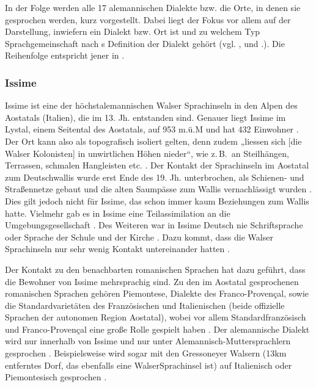 In der Folge werden alle 17 alemannischen Dialekte bzw. die Orte, in denen sie gesprochen werden, kurz vorgestellt. Dabei liegt der Fokus vor allem auf der Darstellung, inwiefern ein Dialekt bzw. Ort  ist und zu welchem Typ Sprachgemeinschaft nach  \citeauthor{Trudgill2011}s \citeyearpar{Trudgill2011} Definition der Dialekt gehört (vgl. ,  und .). Die Reihenfolge entspricht jener in .

\subsubsection{Issime}

Issime ist eine der höchstalemannischen Walser Sprachinseln in den Alpen des Aostatals (Italien), die im 13. Jh. entstanden sind. Genauer liegt Issime im Lystal, einem Seitental des Aostatals, auf 953 m.ü.M \citep[25]{Zürrer1999} und hat 432 Einwohner \citep{Issime2013}. Der Ort kann also als topografisch isoliert gelten, denn zudem „liessen sich [die Walser Kolonisten] in unwirtlichen Höhen nieder“, wie z.\,B.\ an Steilhängen, Terrassen, schmalen Hangleisten etc. \citep[31]{Zürrer1999}. Der Kontakt der Sprachinseln im Aostatal zum Deutschwallis wurde erst Ende des 19. Jh. unterbrochen, als Schienen- und Straßennetze gebaut und die alten Saumpässe zum Wallis vernachlässigt wurden \citep[28]{Zürrer1999}. Dies gilt jedoch nicht für Issime, das schon immer kaum Beziehungen zum Wallis hatte. Vielmehr gab es in Issime eine Teilassimilation an die Umgebungsgesellschaft \citep[28]{Zürrer1999}. Des Weiteren war in Issime Deutsch nie Schriftsprache oder Sprache der Schule und der Kirche \citep[29--30]{Zürrer1999}. Dazu kommt, dass die Walser Sprachinseln nur sehr wenig Kontakt untereinander hatten \citep[28]{Zürrer1999}.

Der Kontakt zu den benachbarten romanischen Sprachen hat dazu geführt, dass die Bewohner von Issime mehrsprachig sind. Zu den im Aostatal gesprochenen romanischen Sprachen gehören Piemontese, Dialekte des Franco-Provençal, sowie die Standardvarietäten des Französischen und Italienischen (beide offizielle Sprachen der autonomen Region Aostatal), wobei vor allem Standardfranzösisch und Franco-Provençal eine große Rolle gespielt haben \citep[28]{Zürrer1999}. Der alemannische Dialekt wird nur innerhalb von Issime und nur unter Alemannisch-Muttersprachlern gesprochen \citep[37]{Zürrer1999}. Beispielsweise wird sogar mit den Gressoneyer Walsern (13km entferntes Dorf, das ebenfalls eine Walser\linebreak Sprachinsel ist) auf Italienisch oder Piemontesisch gesprochen \citep[37]{Zürrer1999}.

